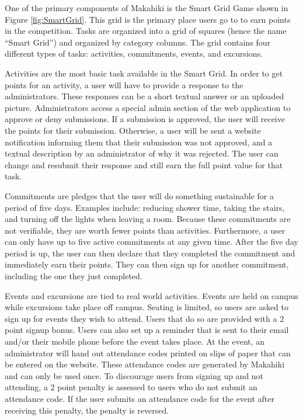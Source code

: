 \documentclass{acm_proc_article-sp}
\begin{document}
One of the primary components of Makahiki is the Smart Grid Game shown in Figure \ref{fig:SmartGrid}. This grid is the primary place users go to to earn points in the competition. Tasks are organized into a grid of squares (hence the name ``Smart Grid'') and organized by category columns. The grid contains four different types of tasks: activities, commitments, events, and excursions.

Activities are the most basic task available in the Smart Grid. In order to get points for an activity, a user will have to provide a response to the administrators. These responses can be a short textual answer or an uploaded picture. Administrators access a special admin section of the web application to approve or deny submissions. If a submission is approved, the user will receive the points for their submission. Otherwise, a user will be sent a website notification informing them that their submission was not approved, and a textual description by an administrator of why it was rejected. The user can change and resubmit their response and still earn the full point value for that task.

Commitments are pledges that the user will do something sustainable for a period of five days. Examples include: reducing shower time, taking the stairs, and turning off the lights when leaving a room. Because these commitments are not verifiable, they are worth fewer points than activities. Furthermore, a user can only have up to five active commitments at any given time. After the five day period is up, the user can then declare that they completed the commitment and immediately earn their points. They can then sign up for another commitment, including the one they just completed.

Events and excursions are tied to real world activities. Events are held on campus while excursions take place off campus. Seating is limited, so users are asked to sign up for events they wish to attend. Users that do so are provided with a 2 point signup bonus. Users can also set up a reminder that is sent to their email and/or their mobile phone before the event takes place. At the event, an administrator will hand out attendance codes printed on slips of paper that can be entered on the website. These attendance codes are generated by Makahiki and can only be used once. To discourage users from signing up and not attending, a 2 point penalty is assessed to users who do not submit an attendance code. If the user submits an attendance code for the event after receiving this penalty, the penalty is reversed.
\end{document}
